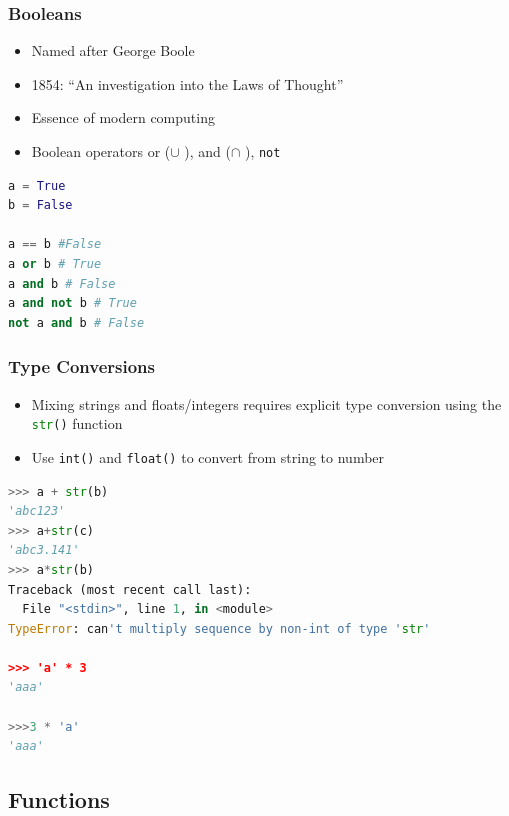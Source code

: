 \documentclass[ngerman]{beamer}
\begin{document}
\begin{frame}[containsverbatim]
\frametitle{Booleans}

\begin{itemize}
	\item Named after George Boole
	\item 1854: \enquote{An investigation into the Laws of Thought}
	\item Essence of modern computing
	\item Boolean operators or ($\cup$ ),  and ($\cap$ ), \texttt{not}
\end{itemize}

\begin{lstlisting}[language={Python}]
a = True
b = False 

a == b #False
a or b # True
a and b # False
a and not b # True
not a and b # False
\end{lstlisting}
\end{frame}



\begin{frame}[containsverbatim]
\frametitle{Type Conversions}

\begin{itemize}
\item Mixing strings and floats/integers requires explicit type conversion using the \lstinline[language={Python}]{str()} function
\item Use \texttt{int()} and \texttt{float()} to convert from string to number
\end{itemize}

\begin{lstlisting}[language={Python}]
>>> a + str(b)
'abc123'
>>> a+str(c)
'abc3.141'
>>> a*str(b)
Traceback (most recent call last):
  File "<stdin>", line 1, in <module>
TypeError: can't multiply sequence by non-int of type 'str'

>>> 'a' * 3
'aaa'

>>>3 * 'a'
'aaa'
\end{lstlisting}


\end{frame}

\subsection{Functions}
\end{document}

